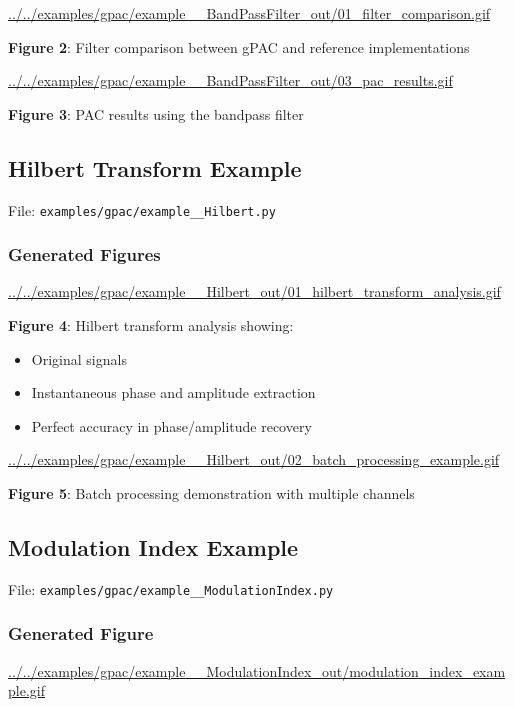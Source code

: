 \documentclass[11pt,a4paper]{article}
\begin{document}
\url{../../examples/gpac/example\_\_BandPassFilter\_out/01\_filter\_comparison.gif}

\textbf{Figure 2}: Filter comparison between gPAC and reference implementations

\url{../../examples/gpac/example\_\_BandPassFilter\_out/03\_pac\_results.gif}

\textbf{Figure 3}: PAC results using the bandpass filter

\subsection{Hilbert Transform Example}
\label{sec:org57d2743}

File: \texttt{examples/gpac/example\_\_Hilbert.py}

\subsubsection{Generated Figures}
\label{sec:orgd3b81c1}

\url{../../examples/gpac/example\_\_Hilbert\_out/01\_hilbert\_transform\_analysis.gif}

\textbf{Figure 4}: Hilbert transform analysis showing:
\begin{itemize}
\item Original signals
\item Instantaneous phase and amplitude extraction
\item Perfect accuracy in phase/amplitude recovery
\end{itemize}

\url{../../examples/gpac/example\_\_Hilbert\_out/02\_batch\_processing\_example.gif}

\textbf{Figure 5}: Batch processing demonstration with multiple channels

\subsection{Modulation Index Example}
\label{sec:org87c483e}

File: \texttt{examples/gpac/example\_\_ModulationIndex.py}

\subsubsection{Generated Figure}
\label{sec:org25abdd4}

\url{../../examples/gpac/example\_\_ModulationIndex\_out/modulation\_index\_example.gif}
\end{document}
